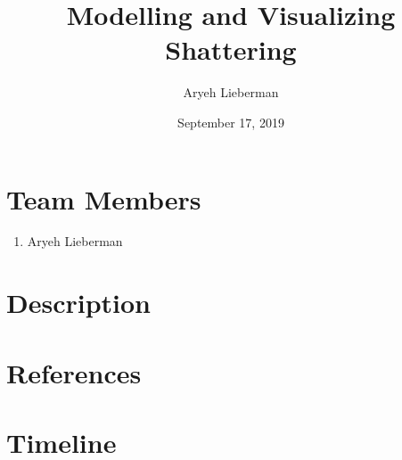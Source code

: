 \documentclass{article}
\author{Aryeh Lieberman}
\title{Modelling and Visualizing Shattering}
\date{September 17, 2019}
\begin{document}
\maketitle
\section{Team Members}
\begin{enumerate}
	\item Aryeh Lieberman
\end{enumerate}
\section{Description}
\section{References}
\section{Timeline}
\end{document}
